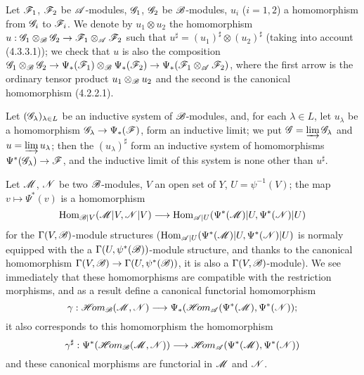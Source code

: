 \begin{env}[4.4.4]
\label{0.4.4.4}
Let $\mathscr{F}_1$, $\mathscr{F}_2$ be $\mathscr{A}$-modules, $\mathscr{G}_1$, $\mathscr{G}_2$ be $\mathscr{B}$-modules,
$u_i$ ($i=1,2$) a homomorphism from $\mathscr{G}_i$ to $\mathscr{F}_i$. We denote by $u_1\otimes u_2$
the homomorphism $u:\mathscr{G}_1\otimes_\mathscr{B}\mathscr{G}_2\to\mathscr{F}_1\otimes_\mathscr{A}\mathscr{F}_2$ such
that $u^\sharp=(u_1)^\sharp\otimes(u_2)^\sharp$ (taking into account (4.3.3.1)); we check
that $u$ is also the composition
$\mathscr{G}_1\otimes_\mathscr{B}\mathscr{G}_2\to\Psi_*(\mathscr{F}_1)\otimes_\mathscr{B}\Psi_*(\mathscr{F}_2)
\to\Psi_*(\mathscr{F}_1\otimes_\mathscr{A}\mathscr{F}_2)$, where the first arrow is the ordinary tensor
product $u_1\otimes_\mathscr{B}u_2$ and the second is the canonical homomorphism (4.2.2.1).
\end{env}

\begin{env}[4.4.5]
\label{0.4.4.5}
Let $(\mathscr{G}_\lambda)_{\lambda\in L}$ be an inductive system of
$\mathscr{B}$-modules, and, for each $\lambda\in L$, let $u_\lambda$ be a
homomorphism $\mathscr{G}_\lambda\to\Psi_*(\mathscr{F})$, form an inductive limit; we put
$\mathscr{G}=\varinjlim\mathscr{G}_\lambda$ and $u=\varinjlim u_\lambda$; then the
$(u_\lambda)^\sharp$ form an inductive system of homomorphisms
$\Psi^*(\mathscr{G}_\lambda)\to\mathscr{F}$, and the inductive limit of this system is
none other than $u^\sharp$.
\end{env}

\begin{env}[4.4.6]
\label{0.4.4.6}
Let $\mathscr{M}$, $\mathscr{N}$ be two $\mathscr{B}$-modules, $V$ an open set of $Y$,
$U=\psi^{-1}(V)$; the map $v\mapsto\Psi^*(v)$ is a homomorphism
\[
  {\mathop{\mathrm{Hom}}\nolimits}_{\mathscr{B}|V}(\mathscr{M}|V,\mathscr{N}|V)
  \longrightarrow{\mathop{\mathrm{Hom}}\nolimits}_{\mathscr{A}|U}(\Psi^*(\mathscr{M})|U,\Psi^*(\mathscr{N})|U)
\]
for the $\Gamma(V,\mathscr{B})$-module structures
(${\mathop{\mathrm{Hom}}\nolimits}_{\mathscr{A}|U}(\Psi^*(\mathscr{M})|U,\Psi^*(\mathscr{N})|U)$ is normaly equipped with the a
$\Gamma(U,\psi^*(\mathscr{B}))$-module structure, and thanks to the canonical homomorphism
 $\Gamma(V,\mathscr{B})\to\Gamma(U,\psi^*(\mathscr{B}))$, it is also a
$\Gamma(V,\mathscr{B})$-module). We see immediately that these homomorphisms are compatible with
the restriction morphisms, and as a result define a canonical functorial homomorphism
\[
  \gamma:\mathscr{H}\!{om}_\mathscr{B}(\mathscr{M},\mathscr{N})
  \longrightarrow\Psi_*(\mathscr{H}\!{om}_\mathscr{A}(\Psi^*(\mathscr{M}),\Psi^*(\mathscr{N}));
\]
it also corresponds to this homomorphism the homomorphism
\[
  \gamma^\sharp:\Psi^*(\mathscr{H}\!{om}_\mathscr{B}(\mathscr{M},\mathscr{N}))
  \longrightarrow\mathscr{H}\!{om}_\mathscr{A}(\Psi^*(\mathscr{M}),\Psi^*(\mathscr{N}))
\]
and these canonical morphisms are functorial in $\mathscr{M}$ and $\mathscr{N}$.
\end{env}

